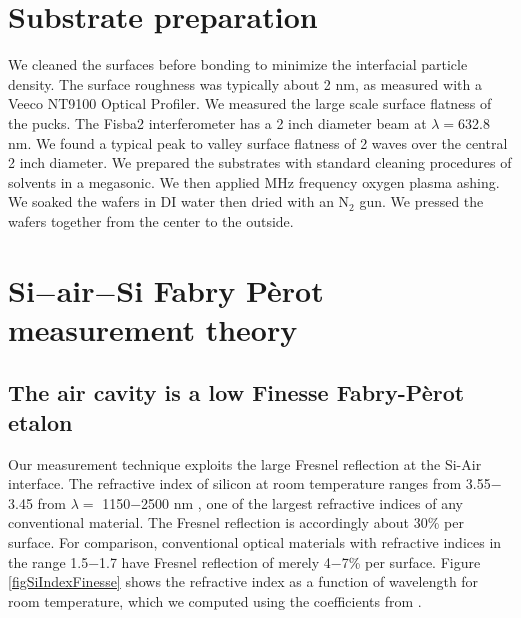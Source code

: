 \documentclass[osajnl,preprint,showpacs,superscriptaddress,12pt]{revtex4-1} %
\begin{document}
\section{Substrate preparation}
We cleaned the surfaces before bonding to minimize the interfacial particle density.  The surface roughness was typically about 2 nm, as measured with a Veeco NT9100 Optical Profiler.  We measured the large scale surface flatness of the pucks.  The Fisba2 interferometer has a 2 inch diameter beam at $\lambda=$632.8 nm.  We found a typical peak to valley surface flatness of 2 waves over the central 2 inch diameter.  We prepared the substrates with standard cleaning procedures of solvents in a megasonic.  We then applied MHz frequency oxygen plasma ashing.  We soaked the wafers in DI water then dried with an N$_2$ gun.  We pressed the wafers together from the center to the outside.

\section{Si$-$air$-$Si Fabry P\`{e}rot measurement theory}
\label{secTheory}


\subsection{The air cavity is a low Finesse Fabry-P\`{e}rot etalon}

Our measurement technique exploits the large Fresnel reflection \cite{2001opt4.book.....H} at the Si-Air interface.  The refractive index of silicon at room temperature ranges from 3.55$-$3.45 from $\lambda = $ 1150$-$2500 nm \cite{2006SPIE.6273E..77F}, one of the largest refractive indices of any conventional material.  The Fresnel reflection is accordingly about 30\% per surface.  For comparison, conventional optical materials with refractive indices in the range 1.5$-$1.7 have Fresnel reflection of merely 4$-$7\% per surface.  Figure \ref{figSiIndexFinesse} shows the refractive index as a function of wavelength for room temperature, which we computed using the coefficients from \cite{2006SPIE.6273E..77F}.
\end{document}
